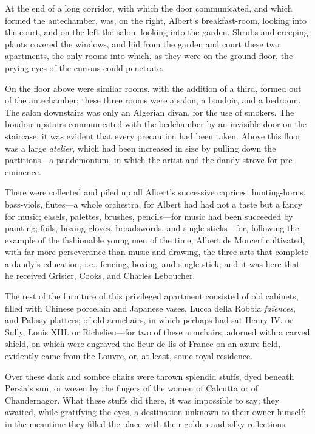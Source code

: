  At the end of a long corridor, with which the door communicated, and which formed the antechamber, was, on the right, Albert's breakfast-room, looking into the court, and on the left the salon, looking into the garden. Shrubs and creeping plants covered the windows, and hid from the garden and court these two apartments, the only rooms into which, as they were on the ground floor, the prying eyes of the curious could penetrate. 

 On the floor above were similar rooms, with the addition of a third, formed out of the antechamber; these three rooms were a salon, a boudoir, and a bedroom. The salon downstairs was only an Algerian divan, for the use of smokers. The boudoir upstairs communicated with the bedchamber by an invisible door on the staircase; it was evident that every precaution had been taken. Above this floor was a large \textit{atelier}, which had been increased in size by pulling down the partitions—a pandemonium, in which the artist and the dandy strove for pre-eminence. 

 There were collected and piled up all Albert's successive caprices, hunting-horns, bass-viols, flutes—a whole orchestra, for Albert had had not a taste but a fancy for music; easels, palettes, brushes, pencils—for music had been succeeded by painting; foils, boxing-gloves, broadswords, and single-sticks—for, following the example of the fashionable young men of the time, Albert de Morcerf cultivated, with far more perseverance than music and drawing, the three arts that complete a dandy's education, i.e., fencing, boxing, and single-stick; and it was here that he received Grisier, Cooks, and Charles Leboucher. 

 The rest of the furniture of this privileged apartment consisted of old cabinets, filled with Chinese porcelain and Japanese vases, Lucca della Robbia \textit{faïences}, and Palissy platters; of old armchairs, in which perhaps had sat Henry IV. or Sully, Louis XIII. or Richelieu—for two of these armchairs, adorned with a carved shield, on which were engraved the fleur-de-lis of France on an azure field, evidently came from the Louvre, or, at least, some royal residence. 

 Over these dark and sombre chairs were thrown splendid stuffs, dyed beneath Persia's sun, or woven by the fingers of the women of Calcutta or of Chandernagor. What these stuffs did there, it was impossible to say; they awaited, while gratifying the eyes, a destination unknown to their owner himself; in the meantime they filled the place with their golden and silky reflections. 

